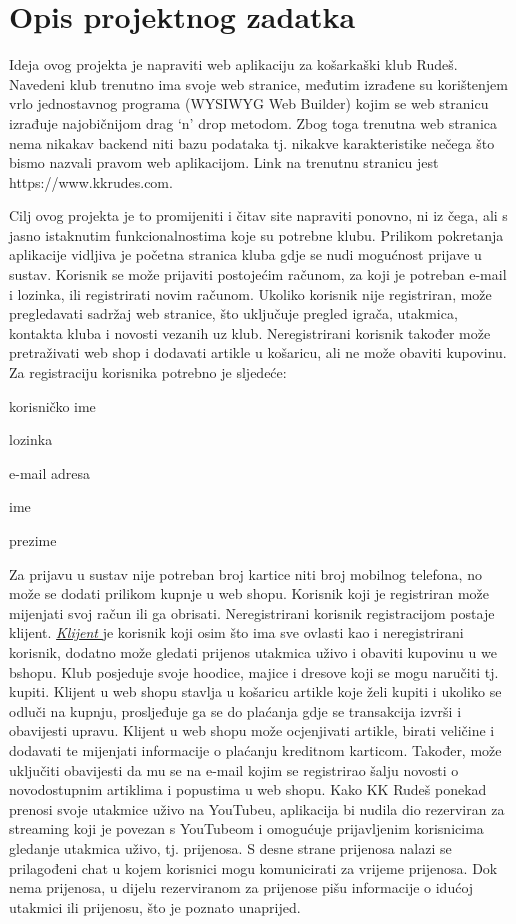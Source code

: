 \chapter{Opis projektnog zadatka}
		
	
		\textnormal{Ideja ovog projekta je napraviti web aplikaciju za košarkaški klub Rudeš. Navedeni klub trenutno ima svoje web stranice, međutim izrađene su korištenjem vrlo jednostavnog programa (WYSIWYG Web Builder) kojim se web stranicu izrađuje najobičnijom drag ‘n’ drop metodom. Zbog toga trenutna web stranica nema nikakav backend niti bazu podataka tj. nikakve karakteristike nečega što bismo nazvali pravom web aplikacijom. Link na trenutnu stranicu jest https://www.kkrudes.com.
		}
	
		\textnormal{Cilj ovog projekta je to promijeniti i čitav site napraviti ponovno, ni iz čega, ali s jasno istaknutim funkcionalnostima koje su potrebne klubu.
		Prilikom pokretanja aplikacije vidljiva je početna stranica kluba gdje se nudi mogućnost prijave u sustav. Korisnik se može prijaviti postojećim računom, za koji je potreban e-mail i lozinka, ili registrirati novim računom. Ukoliko korisnik nije registriran, može pregledavati sadržaj web stranice, što uključuje pregled igrača, utakmica, kontakta kluba i novosti vezanih uz klub. Neregistrirani korisnik također može pretraživati web shop i dodavati artikle u košaricu, ali ne može obaviti kupovinu. Za registraciju korisnika potrebno je sljedeće: }
	\begin{packed_item}
		\item korisničko ime
		\item lozinka
		\item e-mail adresa
		\item ime
		\item prezime
	\end{packed_item}
   \textnormal{ Za prijavu u sustav nije potreban broj kartice niti broj mobilnog telefona, no može se dodati prilikom kupnje u web shopu. Korisnik koji je registriran može mijenjati svoj račun ili ga obrisati. Neregistrirani korisnik registracijom postaje klijent.}
\bigbreak
\underline{\textit{Klijent} }\textnormal {je korisnik koji osim što ima sve ovlasti kao i neregistrirani korisnik, dodatno može gledati prijenos utakmica uživo i obaviti kupovinu u we bshopu. Klub posjeduje svoje hoodice, majice i dresove koji se mogu naručiti tj. kupiti.
Klijent u web shopu stavlja u košaricu artikle koje želi kupiti i ukoliko se odluči na kupnju, prosljeđuje ga se do plaćanja gdje se transakcija izvrši i obavijesti upravu. 
Klijent u web shopu može ocjenjivati artikle, birati veličine i dodavati te mijenjati informacije o plaćanju kreditnom karticom. Također, može uključiti obavijesti da mu se na e-mail kojim se registrirao šalju novosti o novodostupnim artiklima i popustima u web shopu. Kako KK Rudeš ponekad prenosi svoje utakmice uživo na YouTubeu, aplikacija bi nudila dio rezerviran za streaming koji je povezan s YouTubeom i omogućuje prijavljenim korisnicima gledanje utakmica uživo, tj. prijenosa. S desne strane prijenosa nalazi se prilagođeni chat u kojem korisnici mogu komunicirati za vrijeme prijenosa. Dok nema prijenosa, u dijelu rezerviranom za prijenose pišu informacije o idućoj utakmici ili prijenosu, što je poznato unaprijed.}
